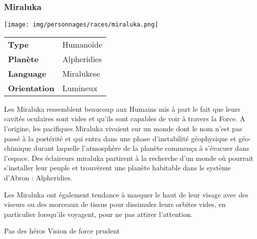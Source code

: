 \subsubsection{Miraluka}
\begin{samepage}
	\vspace{-2\baselineskip}
	\texttt{[image: img/personnages/races/miraluka.png]}

	\vspace{-5\baselineskip}

	\begin{flushright}
		\begin{tabular}{ l l }
			\textbf{Type} 			& Humanoïde \\
		   	\textbf{Planète} 		& Alpheridies \\
		   	\textbf{Language} 		& Miralukese \\
		   	\textbf{Orientation} 	& Lumineux \\
		\end{tabular}
	\end{flushright}
\end{samepage}

Les Miraluka ressemblent beaucoup aux Humains mis à part le fait que leurs cavités oculaires sont vides et qu'ils sont capables de voir à travers la Force. A l'origine, les pacifiques Miraluka vivaient sur un monde dont le nom n'est pas passé à la postérité et qui entra dans une phase d'instabilité géophysique et géo-chimique durant laquelle l'atmosphère de la planète commença à s'évacuer dans l'espace. Des éclaireurs miraluka partirent à la recherche d'un monde où pourrait s'installer leur peuple et trouvèrent une planète habitable dans le système d'Abron : Alpheridies. 

Les Miraluka ont également tendance à masquer le haut de leur visage avec des viseurs ou des morceaux de tissus pour dissimuler leurs orbites vides, en particulier lorsqu'ils voyagent, pour ne pas attirer l'attention.

Pas des héros
Vision de force
prudent


